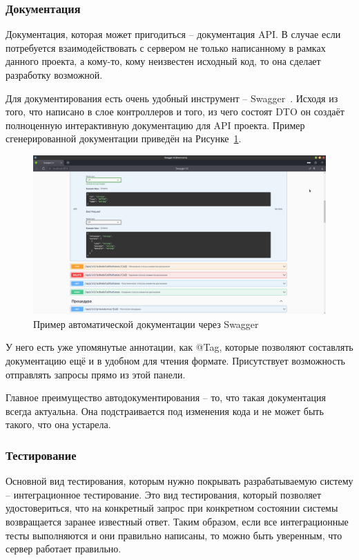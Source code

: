 \documentclass[a4paper,article]{article}
\begin{document}
\begin{sloppypar}
    \subsubsection{Документация}\label{Реализация. Сервер. Документация}

    Документация, которая может пригодиться -- документация API. В случае если потребуется взаимодействовать с сервером не только написанному в рамках данного проекта, а кому-то, кому неизвестен исходный код, то она сделает разработку возможной.

    Для документирования есть очень удобный инструмент -- Swagger~\cite{springguide}. Исходя из того, что написано в слое контроллеров и того, из чего состоят DTO он создаёт полноценную интерактивную документацию для API проекта. Пример сгенерированной документации приведён на Рисунке~\ref{fig:Swagger}.

    \begin{figure}[h]
        \centering
        \includegraphics[width=0.8\linewidth]{Swagger.png}
        \caption{\centering Пример автоматической документации через Swagger}
        \label{fig:Swagger}
    \end{figure}

    У него есть уже упомянутые аннотации, как @Tag, которые позволяют составлять документацию ещё и в удобном для чтения формате. Присутствует возможность отправлять запросы прямо из этой панели.

    Главное преимущество автодокументирования -- то, что такая документация всегда актуальна. Она подстраивается под изменения кода и не может быть такого, что она устарела.

    \subsubsection{Тестирование}\label{Реализация. Сервер. Тестирование}

    Основной вид тестирования, которым нужно покрывать разрабатываемую систему -- интеграционное тестирование. Это вид тестирования, который позволяет удостовериться, что на конкретный запрос при конкретном состоянии системы возвращается заранее известный ответ. Таким образом, если все интеграционные тесты выполняются и они правильно написаны, то можно быть уверенным, что сервер работает правильно.


\end{sloppypar}
\end{document}
